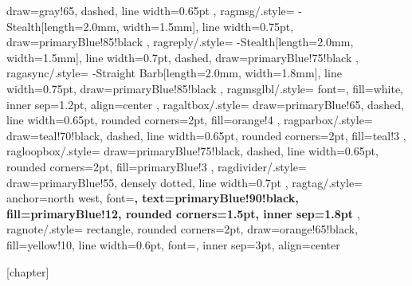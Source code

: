 {{        draw=gray!65, dashed, line width=0.65pt
    },
    ragmsg/.style={
        -{Stealth[length=2.0mm, width=1.5mm]}, line width=0.75pt, draw=primaryBlue!85!black
    },
    ragreply/.style={
        -{Stealth[length=2.0mm, width=1.5mm]}, line width=0.7pt, dashed, draw=primaryBlue!75!black
    },
    ragasync/.style={
        -{Straight Barb[length=2.0mm, width=1.8mm]}, line width=0.75pt, draw=primaryBlue!85!black
    },
    ragmsglbl/.style={
        font=\scriptsize, fill=white, inner sep=1.2pt, align=center
    },
    ragaltbox/.style={
        draw=primaryBlue!65, dashed, line width=0.65pt, rounded corners=2pt, fill=orange!4
    },
    ragparbox/.style={
        draw=teal!70!black, dashed, line width=0.65pt, rounded corners=2pt, fill=teal!3
    },
    ragloopbox/.style={
        draw=primaryBlue!75!black, dashed, line width=0.65pt, rounded corners=2pt, fill=primaryBlue!3
    },
    ragdivider/.style={
        draw=primaryBlue!55, densely dotted, line width=0.7pt
    },
    ragtag/.style={
        anchor=north west, font=\scriptsize\bfseries, text=primaryBlue!90!black,
        fill=primaryBlue!12, rounded corners=1.5pt, inner sep=1.8pt
    },
    ragnote/.style={
        rectangle, rounded corners=2pt, draw=orange!65!black, fill=yellow!10,
        line width=0.6pt, font=\scriptsize, inner sep=3pt, align=center
    }
}

\usepackage{booktabs}
\usepackage{tabularx}
\usepackage{longtable}
\usepackage{array}
\usepackage{float}

[chapter]
\newcommand{\listofcharts}{%
    \cleardoublepage
    \phantomsection
    \addcontentsline{toc}{chapter}{Danh mục biểu đồ}%
    \listof{chart}{Danh mục biểu đồ}%
}

\usepackage{caption}
\usepackage{subcaption}
\captionsetup{
    font=small,
    labelfont=bf,
    labelsep=colon,
    skip=6pt
}

\usepackage{amsmath, amssymb, amsfonts, amsthm}

\theoremstyle{definition}
\newtheorem{example}{Ví dụ}[chapter]
\newtheorem{definition}{Định nghĩa}[chapter]


